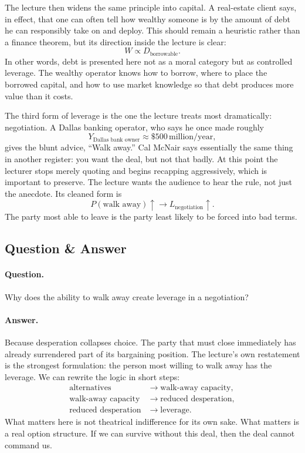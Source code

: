 The lecture then widens the same principle into capital. A real-estate client says, in effect, that one can often tell how wealthy someone is by the amount of debt he can responsibly take on and deploy. This should remain a heuristic rather than a finance theorem, but its direction inside the lecture is clear:
\begin{equation}
W \propto D_{\text{borrowable}}.
\end{equation}
In other words, debt is presented here not as a moral category but as controlled leverage. The wealthy operator knows how to borrow, where to place the borrowed capital, and how to use market knowledge so that debt produces more value than it costs.

The third form of leverage is the one the lecture treats most dramatically: negotiation. A Dallas banking operator, who says he once made roughly
\begin{equation}
Y_{\text{Dallas bank owner}} \approx \$500\,\text{million/year},
\end{equation}
gives the blunt advice, ``Walk away.'' Cal McNair says essentially the same thing in another register: you want the deal, but not that badly. At this point the lecturer stops merely quoting and begins recapping aggressively, which is important to preserve. The lecture wants the audience to hear the rule, not just the anecdote. Its cleaned form is
\begin{equation}
P(\text{walk away})\uparrow \to L_{\text{negotiation}}\uparrow.
\end{equation}
The party most able to leave is the party least likely to be forced into bad terms.

\subsection{Question \& Answer}

\paragraph{Question.} Why does the ability to walk away create leverage in a negotiation?

\paragraph{Answer.} Because desperation collapses choice. The party that must close immediately has already surrendered part of its bargaining position. The lecture's own restatement is the strongest formulation: the person most willing to walk away has the leverage. We can rewrite the logic in short steps:
\begin{align}
\text{alternatives} &\to \text{walk-away capacity}, \\
\text{walk-away capacity} &\to \text{reduced desperation}, \\
\text{reduced desperation} &\to \text{leverage}.
\end{align}
What matters here is not theatrical indifference for its own sake. What matters is a real option structure. If we can survive without this deal, then the deal cannot command us.


